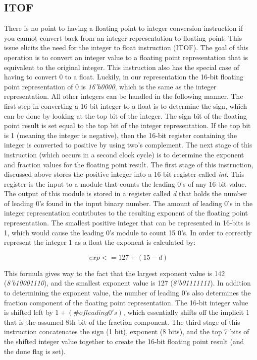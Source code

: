 \documentclass[conference]{IEEEtran}
\begin{document}
    \subsection{ITOF}
	There is no point to having a floating point to integer conversion instruction if you cannot convert back from an integer representation to floating point. This issue elicits the need for the integer to float instruction (ITOF). The goal of this operation is to convert an integer value to a floating point representation that is equivalent to the original integer. This instruction also has the special case of having to convert 0 to a float. Luckily, in our representation the 16-bit floating point representation of 0 is \textit{16'h0000}, which is the same as the integer representation. All other integers can be handled in the following manner. The first step in converting a 16-bit integer to a float is to determine the sign, which can be done by looking at the top bit of the integer. The sign bit of the floating point result is set equal to the top bit of the integer representation. If the top bit is 1 (meaning the integer is negative), then the 16-bit register containing the integer is converted to positive by using two's complement. The next stage of this instruction (which occurs in a second clock cycle) is to determine the exponent and fraction values for the floating point result. The first stage of this instruction, discussed above stores the positive integer into a 16-bit register called \textit{int}. This register is the input to a module that counts the leading 0's of any 16-bit value. The output of this module is stored in a register called \textit{d} that holds the number of leading 0's found in the input binary number. The amount of leading 0's in the integer representation contributes to the resulting exponent of the floating point representation. The smallest positive integer that can be represented in 16-bits is 1, which would cause the leading 0's module to count 15 0's. In order to correctly represent the integer 1 as a float the exponent is calculated by:
    
    \begin{equation} 
    exp <= 127 + (15 - d)
    \end{equation}
    
    This formula gives way to the fact that the largest exponent value is 142 (\textit{8'b10001110}), and the smallest exponent value is 127 (\textit{8'b01111111}). In addition to determining the exponent value, the number of leading 0's also determines the fraction component of the floating point representation. The 16-bit integer value is shifted left by $1 + (\# of leading 0's)$, which essentially shifts off the implicit 1 that is the assumed 8th bit of the fraction component. The third stage of this instruction concatenates the sign (1 bit), exponent (8 bits), and the top 7 bits of the shifted integer value together to create the 16-bit floating point result (and the done flag is set).
    
\end{document}
